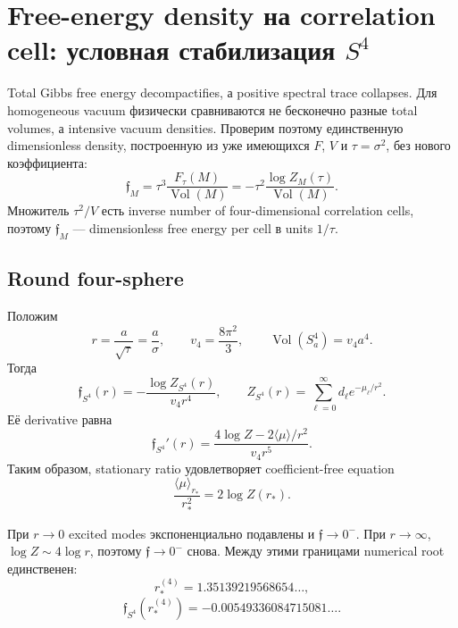 \chapter{Free-energy density на correlation cell: условная стабилизация \texorpdfstring{\(S^4\)}{S4}}

Total Gibbs free energy decompactifies, а positive spectral trace collapses.
Для homogeneous vacuum физически сравниваются не бесконечно разные total
volumes, а intensive vacuum densities. Проверим поэтому единственную
dimensionless density, построенную из уже имеющихся \(F\), \(V\) и
\(\tau=\sigma^2\), без нового коэффициента:
\begin{equation}
 \mathfrak f_M
 =\tau^3\frac{F_\tau(M)}{\operatorname{Vol}(M)}
 =-\tau^2\frac{\log Z_M(\tau)}{\operatorname{Vol}(M)}.
 \label{eq:correlation-cell-density}
\end{equation}
Множитель \(\tau^2/V\) есть inverse number of four-dimensional correlation
cells, поэтому \(\mathfrak f_M\) --- dimensionless free energy per cell в
units \(1/\tau\).

\section{Round four-sphere}

Положим
\begin{equation}
 r=\frac{a}{\sqrt\tau}=\frac a\sigma,
 \qquad
 v_4=\frac{8\pi^2}{3},
 \qquad
 \operatorname{Vol}(S^4_a)=v_4a^4.
\end{equation}
Тогда
\begin{equation}
 \mathfrak f_{S^4}(r)
 =-\frac{\log Z_{S^4}(r)}{v_4r^4},
 \qquad
 Z_{S^4}(r)=\sum_{\ell=0}^\infty d_\ell e^{-\mu_\ell/r^2}.
\end{equation}
Её derivative равна
\begin{equation}
 \mathfrak f_{S^4}'(r)
 =\frac{4\log Z-2\langle\mu\rangle/r^2}{v_4r^5}.
 \label{eq:cell-density-derivative}
\end{equation}
Таким образом, stationary ratio удовлетворяет coefficient-free equation
\begin{equation}
 \boxed{
 \frac{\langle\mu\rangle_{r_*}}{r_*^2}
 =2\log Z(r_*)}.
 \label{eq:cell-density-stationarity}
\end{equation}

При \(r\to0\) excited modes экспоненциально подавлены и
\(\mathfrak f\to0^-\). При \(r\to\infty\),
\(\log Z\sim4\log r\), поэтому \(\mathfrak f\to0^-\) снова. Между этими
границами numerical root единственен:
\begin{equation}
 r_*^{(4)}=1.35139219568654\ldots,
\end{equation}
\begin{equation}
 \mathfrak f_{S^4}(r_*^{(4)})
 =-0.00549336084715081\ldots.
\end{equation}

